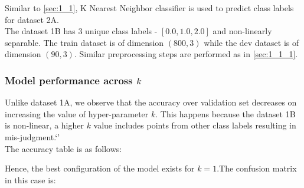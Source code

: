 \documentclass[11pt,a4paper]{article}
\newcommand{\noi}{\noindent}
\begin{document}
Similar to \autoref{sec:1_1}, K Nearest Neighbor classifier is used to predict class labels for dataset 2A. \\

\noi
The dataset 1B has 3 unique class labels - $[0.0, 1.0, 2.0]$ and non-linearly separable. The train dataset is of dimension $(800,3)$ while the dev dataset is of dimension $(90,3)$. Similar preprocessing steps are performed as in \autoref{sec:1_1_1}.

\subsubsection{Model performance across $k$}
Unlike dataset 1A, we observe that the accuracy over validation set decreases on increasing the value of hyper-parameter $k$. This happens because the dataset 1B is non-linear, a higher $k$ value includes points from other class labels resulting in mis-judgment.`'\\

\noi
The accuracy table is as follows:


\noi 
Hence, the best configuration of the model exists for $k=1$.The confusion matrix in this case is:
\end{document}
